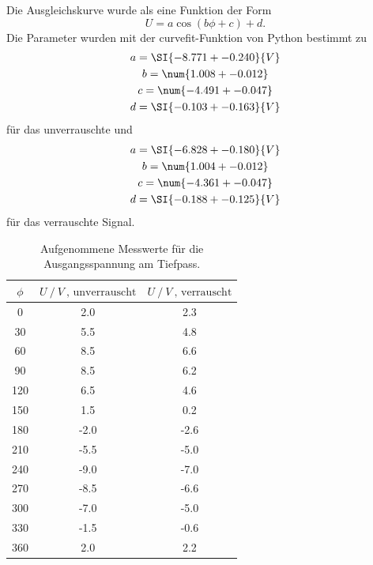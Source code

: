 Die Ausgleichskurve wurde als eine Funktion der Form
\begin{equation*}
    U = a\cos{(b\phi + c)} +d .
\end{equation*}
Die Parameter wurden mit der curvefit-Funktion von Python bestimmt zu 
\begin{gather*}
    a = \SI{-8.771 +- 0.240}{V} \\
    b = \num{1.008 +- 0.012} \\
    c = \num{-4.491 +- 0.047} \\
    d = \SI{-0.103 +- 0.163}{V} \\
\end{gather*}
für das unverrauschte und
\begin{gather*}
    a = \SI{-6.828 +- 0.180}{V} \\
    b = \num{1.004 +- 0.012} \\
    c = \num{-4.361 +- 0.047} \\
    d = \SI{-0.188 +- 0.125}{V} \\
\end{gather*}
für das verrauschte Signal.
\begin{table}
	\centering
	\caption{Aufgenommene Messwerte für die Ausgangsspannung am Tiefpass.}
	\label{tab:messdaten}
	\begin{tabular}{ S S S }
		\toprule
		{ $\phi$ } & { $ U \: / \: \si{V} \: \text{, unverrauscht} $} & {$ U \: / \: \si{V} \: \text{, verrauscht} $} \\
		 & 2.0 & 2.3 \\ 
            30 & 5.5 & 4.8 \\ 
            60 & 8.5 & 6.6 \\ 
            90 & 8.5 & 6.2 \\
            120 & 6.5 & 4.6 \\ 
            150 & 1.5 & 0.2 \\ 
            180 & -2.0 & -2.6 \\ 
            210 & -5.5 & -5.0 \\
            240 & -9.0 & -7.0 \\ 
            270 & -8.5 & -6.6 \\ 
            300 & -7.0 & -5.0 \\
            330 & -1.5 & -0.6 \\
            360 & 2.0 & 2.2 \\
	\end{tabular}
\end{table}
